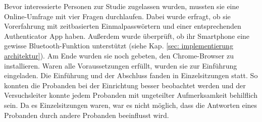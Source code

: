 Bevor interessierte Personen zur Studie zugelassen wurden, mussten sie eine 
Online-Umfrage mit vier Fragen durchlaufen. Dabei wurde erfragt, ob sie 
Vorerfahrung mit zeitbasierten Einmalpasswörtern und einer entsprechenden 
Authenticator App haben. Außerdem wurde überprüft, ob ihr Smartphone eine 
gewisse Bluetooth-Funktion unterstützt (siehe Kap. \ref{sec: implementierung architektur}). Am Ende 
wurden sie noch gebeten, den Chrome-Browser zu installieren. Waren alle 
Voraussetzungen erfüllt, wurden sie zur Einführung eingeladen. Die Einführung 
und der Abschluss fanden in Einzelsitzungen statt. So konnten die Probanden 
bei der Einrichtung besser beobachtet werden und der Versuchsleiter konnte jedem 
Probanden mit ungeteilter Aufmerksamkeit behilflich sein. Da es Einzelsitzungen waren, war es nicht möglich, dass die Antworten eines Probanden durch 
andere Probanden beeinflusst wird.